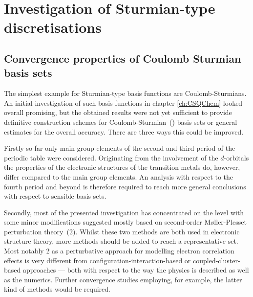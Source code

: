 
%
%
\section{Investigation of Sturmian-type discretisations}
\label{sec:newSturmian}

\subsection{Convergence properties of Coulomb Sturmian basis sets}
The simplest example for Sturmian-type basis functions are Coulomb-Sturmians.
An initial investigation of such basis functions
in chapter \ref{ch:CSQChem} looked overall promising,
but the obtained results were not yet sufficient to provide definitive
construction schemes for Coulomb-Sturmian~(\CS) basis sets
or general estimates for the overall accuracy.
There are three ways this could be improved.

Firstly so far only main group elements of the second and third
period of the periodic table were considered.
Originating from the involvement of the $d$-orbitals
the properties of the electronic structures of the transition metals do, however,
differ compared to the main group elements.
An analysis with respect to the fourth period and beyond
is therefore required to reach more general conclusions
with respect to sensible \CS basis sets.

Secondly, most of the presented investigation has concentrated on the \HF
level with some minor modifications suggested mostly based on
second-order Møller-Plesset perturbation theory~({\MP}2).
Whilst these two methods are both used in electronic structure theory,
more methods should be added to reach a representative set.
Most notably {\MP}2 as a perturbative approach
for modelling electron correlation effects is very different from
configuration-interaction-based
or coupled-cluster-based approaches
--- both with respect to the way the physics is described
as well as the numerics.
Further convergence studies employing, for example, the latter kind of methods
would be required.

